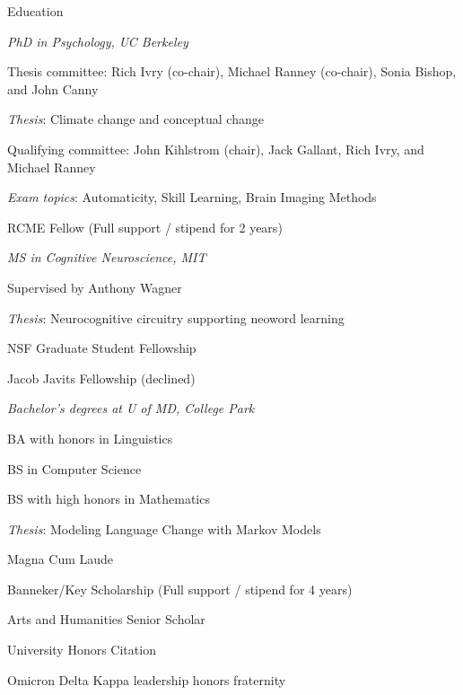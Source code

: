 \begin{rubric}{Education}

\entry*[2007--2013] \emph{PhD in Psychology, UC Berkeley}
\par Thesis committee: Rich Ivry (co-chair), Michael Ranney (co-chair), Sonia
Bishop, and John Canny
\par \emph{Thesis}: Climate change and conceptual change
\par Qualifying committee: John Kihlstrom (chair), Jack Gallant, Rich Ivry, and
Michael Ranney
\par \emph{Exam topics}: Automaticity, Skill Learning, Brain Imaging Methods
\par RCME Fellow (Full support / stipend for 2 years)


\entry*[1999--2002] \emph{MS in Cognitive Neuroscience, MIT}
\par Supervised by Anthony Wagner
\par \emph{Thesis}: Neurocognitive circuitry supporting neoword learning
\par NSF Graduate Student Fellowship
\par Jacob Javits Fellowship (declined)




\entry*[1995--1999] \emph{Bachelor's degrees at U of MD, College Park}
\par BA with honors in Linguistics
\par BS in Computer Science
\par BS with high honors in Mathematics
\par \emph{Thesis}: Modeling Language Change with Markov Models
\par Magna Cum Laude
\par Banneker/Key Scholarship (Full support / stipend for 4 years)
\par Arts and Humanities Senior Scholar
\par University Honors Citation
\par Omicron Delta Kappa leadership honors fraternity

 

\end{rubric}
